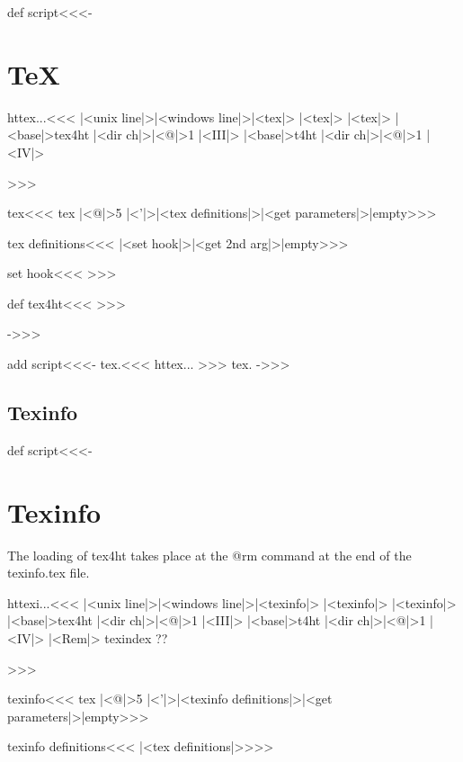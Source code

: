 \documentclass{article}
\begin{document}
\<def script\><<<-

\section{TeX}


\<httex...\><<<
|<unix line|>|<windows line|>|<tex|>
        |<tex|>
        |<tex|>
        |<base|>tex4ht |<dir ch|>|<@|>1 |<III|>
        |<base|>t4ht |<dir ch|>|<@|>1 |<IV|>

>>>

\<tex\><<<
tex  |<@|>5 |<'|>|<tex definitions|>|<get parameters|>|empty>>>


\<tex definitions\><<<
|<set hook|>|<get 2nd arg|>|empty>>>

\<set hook\><<<
\def\Link#1.a.b.c.{|<def tex4ht|>{|<options|> }}>>>


\<def tex4ht\><<<
\expandafter\def\csname tex4ht\endcsname>>>

->>>


\<add script\><<<-
\<\pref tex.\ext\><<<
\<httex...\>
>>> %
%
\OutputCodE\<\pref tex.\ext\>      %
%
->>>

\subsection{Texinfo}


\<def script\><<<-
\section{Texinfo}

The loading of tex4ht takes place at the @rm command at the end of the
texinfo.tex file.

\<httexi...\><<<
|<unix line|>|<windows line|>|<texinfo|>
        |<texinfo|>
        |<texinfo|>
        |<base|>tex4ht |<dir ch|>|<@|>1 |<III|>
        |<base|>t4ht |<dir ch|>|<@|>1 |<IV|>
|<Rem|>        texindex ??

>>>

\<texinfo\><<<
tex  |<@|>5 |<'|>|<texinfo definitions|>|<get parameters|>|empty>>>


\<texinfo definitions\><<<
|<tex definitions|>\let\svrm=\rm\def\rm{\svrm|<tex4ht into texinfo|>}>>>
\end{document}

